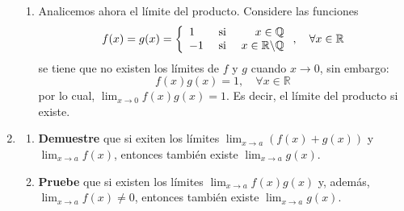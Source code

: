 \documentclass[12pt]{article}
\begin{document}
\begin{enumerate}
\begin{sol}
\begin{enumerate}
            \item Analicemos ahora el límite del producto. Considere las funciones
            \begin{equation*}
                f(x)=g(x)=\left\{
                    \begin{array}{lcr}
                        1 & \textup{ si } & x\in\mathbb{Q}\\
                        -1 & \textup{ si } & x\in\mathbb{R}\backslash\mathbb{Q} \\
                    \end{array}
                \right.,\quad\forall x\in\mathbb{R}
            \end{equation*}
            se tiene que no existen los límites de $f$ y $g$ cuando $x\rightarrow 0$, sin embargo:
            \begin{equation*}
                f(x)g(x)=1,\quad\forall x\in\mathbb{R}
            \end{equation*}
            por lo cual, $\lim_{x\rightarrow 0}f(x)g(x)=1$. Es decir, el límite del producto si existe.
        \end{enumerate}
    \end{sol}
    \item \begin{enumerate}
        \item \textbf{Demuestre} que si exiten los límites $\lim_{x\rightarrow a}(f(x)+g(x))$ y $\lim_{x\rightarrow a}f(x)$, entonces también existe $\lim_{x\rightarrow a}g(x)$.
        \item \textbf{Pruebe} que si existen los límites $\lim_{x\rightarrow a}f(x)g(x)$ y, además, $\lim_{x\rightarrow a}f(x)\neq 0$, entonces también existe $\lim_{x\rightarrow a}g(x)$.
    \end{enumerate}


\end{enumerate}
\end{document}
